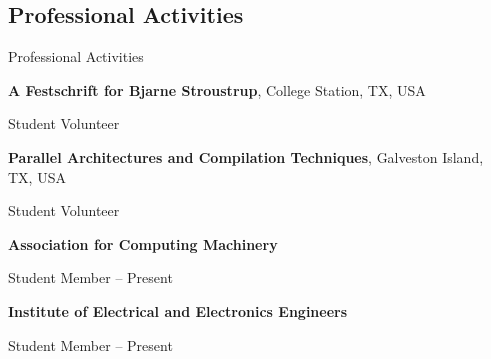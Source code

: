 \documentclass[a4paper,10pt,oneside]{article}
\begin{document}
\begin{body}
\section{Professional Activities}
{Professional Activities}

{\textbf{A Festschrift for Bjarne Stroustrup}, College Station, TX, USA }
\par
Student Volunteer
\hfill
{}

\EntryGap


{\textbf{Parallel Architectures and Compilation Techniques}, Galveston Island, TX, USA }
\par
Student Volunteer
\hfill
{}


\EntryGap

{\textbf{Association for Computing Machinery}}
\par
Student Member
\hfill
{} --
Present

\EntryGap
{\textbf{Institute of Electrical and Electronics Engineers }}
\par
Student Member
\hfill
{} --
Present







\end{body}
\end{document}

